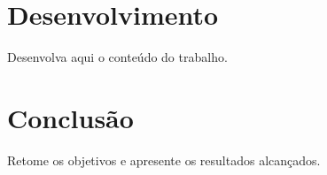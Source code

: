 \documentclass[12pt,a4paper,oneside]{book}
\begin{document}
\chapter{Desenvolvimento}\label{cap:desenvolvimento}

Desenvolva aqui o conteúdo do trabalho.

\chapter{Conclusão}\label{cap:conclusao}

Retome os objetivos e apresente os resultados alcançados.


\backmatter

%
\end{document}
